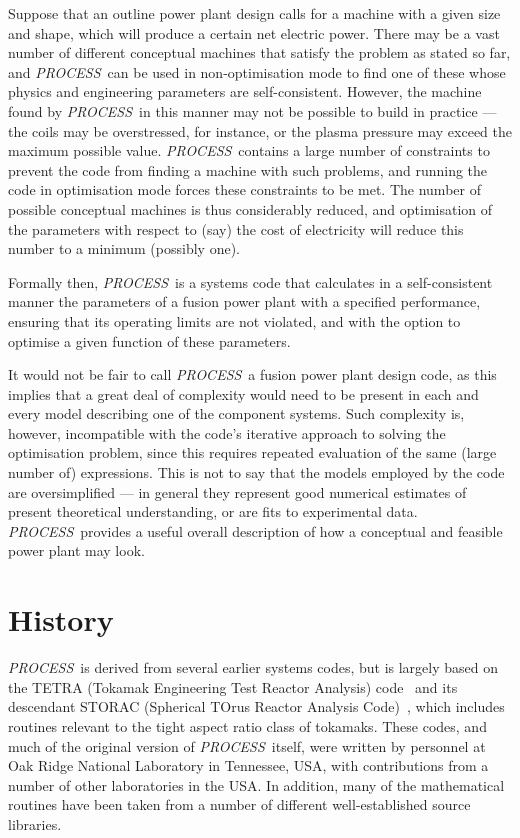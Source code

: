 \documentclass[11pt,a4paper]{report}
\newcommand{\PS}{\mbox{\it PROCESS\/ }}
\begin{document}
Suppose that an outline power plant design calls for a machine with a given
size and shape, which will produce a certain net electric power.  There may be
a vast number of different conceptual machines that satisfy the problem as
stated so far, and \PS can be used in non-optimisation mode to find one of
these whose physics and engineering parameters are self-consistent. However,
the machine found by \PS in this manner may not be possible to build in
practice --- the coils may be overstressed, for instance, or the plasma
pressure may exceed the maximum possible value. \PS contains a large number of
constraints to prevent the code from finding a machine with such problems, and
running the code in optimisation mode forces these constraints to be met. The
number of possible conceptual machines is thus considerably reduced, and
optimisation of the parameters with respect to (say) the cost of electricity
will reduce this number to a minimum (possibly one).

Formally then, \PS is a systems code that calculates in a self-consistent
manner the parameters of a fusion power plant with a specified performance,
ensuring that its operating limits are not violated, and with the option to
optimise a given function of these parameters.

It would not be fair to call \PS a fusion power plant design code, as this
implies that a great deal of complexity would need to be present in each and
every model describing one of the component systems. Such complexity is,
however, incompatible with the code's iterative approach to solving the
optimisation problem, since this requires repeated evaluation of the same
(large number of) expressions. This is not to say that the models employed by
the code are oversimplified --- in general they represent good numerical
estimates of present theoretical understanding, or are fits to experimental
data. \PS provides a useful overall description of how a conceptual and
feasible power plant may look.

\section{History}

\PS is derived from several earlier systems codes, but is largely based on the
TETRA (Tokamak Engineering Test Reactor Analysis) code~\cite{tetra} and its
descendant STORAC (Spherical TOrus Reactor Analysis Code)~\cite{storac}, which
includes routines relevant to the tight aspect ratio class of tokamaks. These
codes, and much of the original version of \PS itself, were written by
personnel at Oak Ridge National Laboratory in Tennessee, USA, with
contributions from a number of other laboratories in the USA\@. In addition,
many of the mathematical routines have been taken from a number of different
well-established source libraries.
\end{document}
